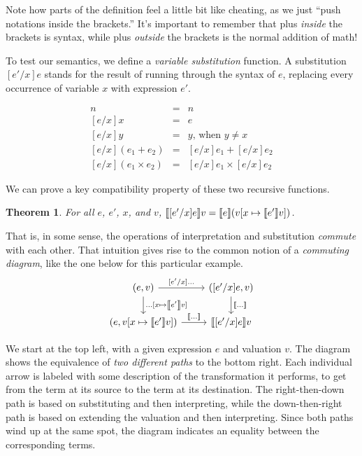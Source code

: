 \documentclass{amsbook}
\newtheorem{theorem}{Theorem}[chapter]
\theoremstyle{definition}
\theoremstyle{remark}
\numberwithin{section}{chapter}
\numberwithin{equation}{chapter}
\begin{document}
Note how parts of the definition feel a little bit like cheating, as we just ``push notations inside the brackets.''
It's important to remember that plus \emph{inside} the brackets is syntax, while plus \emph{outside} the brackets is the normal addition of math!

\newcommand{\subst}[3]{[#3/#2]#1}

To test our semantics, we define a \emph{variable substitution} function.
A substitution $\subst{e}{x}{e'}$ stands for the result of running through the syntax of $e$,
replacing every occurrence of variable $x$ with expression $e'$.

\begin{eqnarray*}
  \subst{n}{x}{e} &=& n \\
  \subst{x}{x}{e} &=& e \\
  \subst{y}{x}{e} &=& y \textrm{, when $y \neq x$} \\
  \subst{(e_1 + e_2)}{x}{e} &=& \subst{e_1}{x}{e} + \subst{e_2}{x}{e} \\
  \subst{(e_1 \times e_2)}{x}{e} &=& \subst{e_1}{x}{e} \times \subst{e_2}{x}{e}
\end{eqnarray*}

We can prove a key compatibility property of these two recursive functions.

\begin{theorem}
  For all $e$, $e'$, $x$, and $v$, $\denote{\subst{e}{x}{e'}}{v} = \denote{e}{(\mupd{v}{x}{\denote{e'}{v}})}$.
\end{theorem}

That is, in some sense, the operations of interpretation and substitution \emph{commute} with each other.
That intuition gives rise to the common notion of a \emph{commuting diagram}, like the one below for this particular example.
\[
\begin{tikzcd}
(e, v) \arrow{r}{\subst{\ldots}{x}{e'}} \arrow{d}{\mupd{\ldots}{x}{\denote{e'}v}} & (\subst{e}{x}{e'}, v) \arrow{d}{\denote{\ldots}} \\
(e, \mupd{v}{x}{\denote{e'}v}) \arrow{r}{\denote{\ldots}} & \denote{\subst{e}{x}{e'}}v
\end{tikzcd}
\]

We start at the top left, with a given expression $e$ and valuation $v$.
The diagram shows the equivalence of \emph{two different paths} to the bottom right.
Each individual arrow is labeled with some description of the transformation it performs, to get from the term at its source to the term at its destination.
The right-then-down path is based on substituting and then interpreting, while the down-then-right path is based on extending the valuation and then interpreting.
Since both paths wind up at the same spot, the diagram indicates an equality between the corresponding terms.
\end{document}

